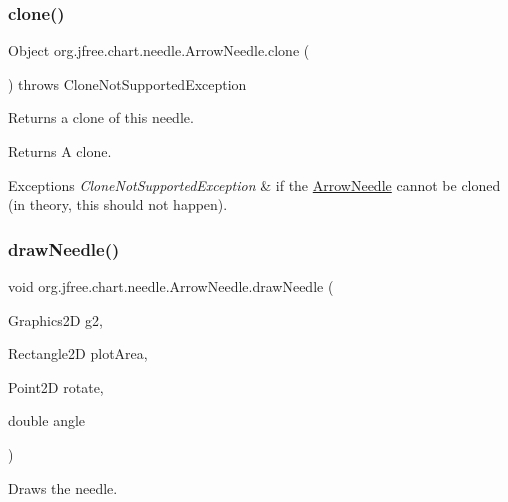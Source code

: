\subsubsection{\texorpdfstring{clone()}{clone()}}
{\footnotesize\ttfamily Object org.\+jfree.\+chart.\+needle.\+Arrow\+Needle.\+clone (\begin{DoxyParamCaption}{ }\end{DoxyParamCaption}) throws Clone\+Not\+Supported\+Exception}

Returns a clone of this needle.

\begin{DoxyReturn}{Returns}
A clone.
\end{DoxyReturn}

\begin{DoxyExceptions}{Exceptions}
{\em Clone\+Not\+Supported\+Exception} & if the {\ttfamily \mbox{\hyperlink{classorg_1_1jfree_1_1chart_1_1needle_1_1_arrow_needle}{Arrow\+Needle}}} cannot be cloned (in theory, this should not happen). \\
\hline
\end{DoxyExceptions}
\mbox{\label{classorg_1_1jfree_1_1chart_1_1needle_1_1_arrow_needle_a20f66ecce6a13085865604fbd07c089b}} 
\subsubsection{\texorpdfstring{draw\+Needle()}{drawNeedle()}}
{\footnotesize\ttfamily void org.\+jfree.\+chart.\+needle.\+Arrow\+Needle.\+draw\+Needle (\begin{DoxyParamCaption}\item[{Graphics2D}]{g2,  }\item[{Rectangle2D}]{plot\+Area,  }\item[{Point2D}]{rotate,  }\item[{double}]{angle }\end{DoxyParamCaption})\hspace{0.3cm}{\ttfamily [protected]}}

Draws the needle.


